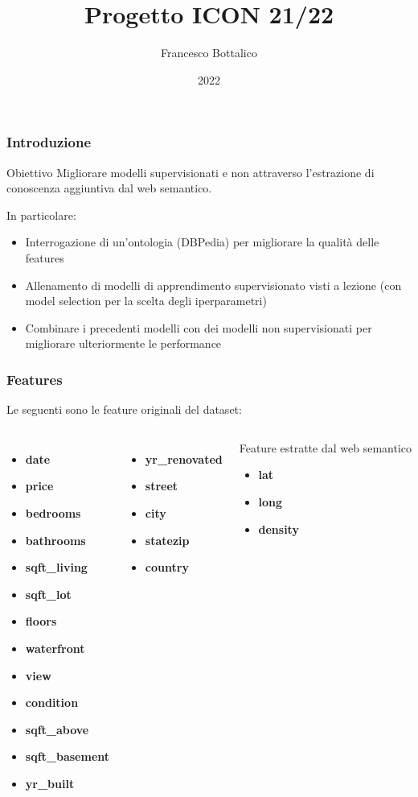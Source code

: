 \documentclass{beamer}
\title{Progetto ICON 21/22}
\author{Francesco Bottalico}
\date{2022}
\begin{document}
\frame{\titlepage}

\begin{frame}
	\frametitle{Introduzione}
	\begin{block}{Obiettivo}
		Migliorare modelli supervisionati e non attraverso l'estrazione di
		conoscenza aggiuntiva dal web semantico.
	\end{block}
	In particolare:
	\begin{itemize}
		\item Interrogazione di un'ontologia (DBPedia) per migliorare la qualità
			delle features
		\item Allenamento di modelli di apprendimento supervisionato visti a
			lezione (con model selection per la scelta degli iperparametri)
		\item Combinare i precedenti modelli con dei modelli non supervisionati
			per migliorare ulteriormente le performance
	\end{itemize}
\end{frame}

\begin{frame}
	\frametitle{Features}
	Le seguenti sono le feature originali del dataset:
	\begin{columns}
		\begin{itemize}
			\itemsep0em
			\item \textbf{date}
			\item \textbf{price}
			\item \textbf{bedrooms}
			\item \textbf{bathrooms}
			\item \textbf{sqft\_living}
			\item \textbf{sqft\_lot}
			\item \textbf{floors}
			\item \textbf{waterfront}
			\item \textbf{view}
			\item \textbf{condition}
			\item \textbf{sqft\_above}
			\item \textbf{sqft\_basement}
			\item \textbf{yr\_built}
		\end{itemize}
		\begin{itemize}
			\item \textbf{yr\_renovated}
			\item \textbf{street}
			\item \textbf{city}
			\item \textbf{statezip}
			\item \textbf{country}
		\end{itemize}
		\begin{alertblock}{Feature estratte dal web semantico}
			\begin{itemize}
				\item \textbf{lat}
				\item \textbf{long}
				\item \textbf{density}
			\end{itemize}
		\end{alertblock}
	\end{columns}
\end{frame}
\end{document}
